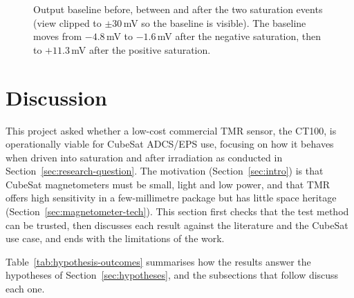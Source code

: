 \documentclass[12pt,a4paper]{article}
\begin{document}
 
\begin{figure}[H]
\centering
{}
\caption{Output baseline before, between and after the two saturation events (view clipped to $\pm30$\,mV so the baseline is visible). The baseline moves from $-4.8$\,mV to $-1.6$\,mV after the negative saturation, then to $+11.3$\,mV after the positive saturation.}
\label{fig:mh-baseline}
\end{figure}
 

 

\section{Discussion}
\label{sec:discussion}

This project asked whether a low-cost commercial TMR sensor, the CT100, is operationally viable for CubeSat ADCS/EPS use, focusing on how it behaves when driven into saturation and after irradiation as conducted in Section~\ref{sec:research-question}. The motivation (Section~\ref{sec:intro}) is that CubeSat magnetometers must be small, light and low power, and that TMR offers high sensitivity in a few-millimetre package but has little space heritage (Section~\ref{sec:magnetometer-tech}). This section first checks that the test method can be trusted, then discusses each result against the literature and the CubeSat use case, and ends with the limitations of the work.

Table~\ref{tab:hypothesis-outcomes} summarises how the results answer the hypotheses of Section~\ref{sec:hypotheses}, and the subsections that follow discuss each one.
\end{document}
